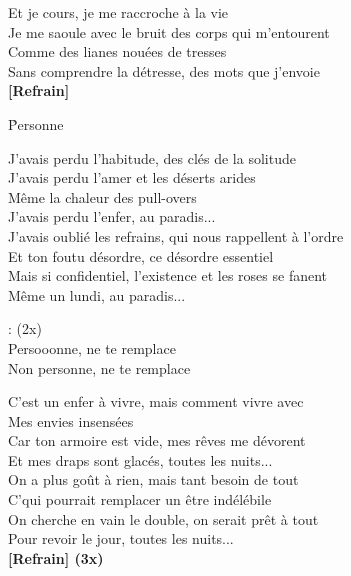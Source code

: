 \documentclass{novel}
\begin{document}
{{\begin{minipage}[t][0.4\textheight][t]{\textwidth}
\begin{multicols}{2}
Et je cours, je me raccroche à la vie\\
Je me saoule avec le bruit des corps qui m'entourent\\
Comme des lianes nouées de tresses\\
Sans comprendre la détresse, des mots que j'envoie\\

\textbf{[Refrain]}

\end{multicols}
\end{minipage}

\nointerlineskip
\begin{minipage}[b][0.55\textheight][t]{\textwidth}
\vspace{0.15\textheight}
\h*{Personne}

\begin{multicols}{2}
J'avais perdu l'habitude, des clés de la solitude\\
J'avais perdu l'amer et les déserts arides\\
Même la chaleur des pull-overs\\
J'avais perdu l'enfer, au paradis...\\

J'avais oublié les refrains, qui nous rappellent à l'ordre\\
Et ton foutu désordre, ce désordre essentiel\\
Mais si confidentiel, l'existence et les roses se fanent\\
Même un lundi, au paradis...\\

\begin{bfseries}
[Refrain]: (2x)\\
Persooonne, ne te remplace\\
Non personne, ne te remplace\\
\end{bfseries}
\columnbreak

C'est un enfer à vivre, mais comment vivre avec\\
Mes envies insensées\\
Car ton armoire est vide, mes rêves me dévorent\\
Et mes draps sont glacés, toutes les nuits...\\

On a plus goût à rien, mais tant besoin de tout\\
C'qui pourrait remplacer un être indélébile\\
On cherche en vain le double, on serait prêt à tout\\
Pour revoir le jour, toutes les nuits...\\

\textbf{[Refrain] (3x)}

\end{multicols}
\end{minipage}
}
}
\end{document}
